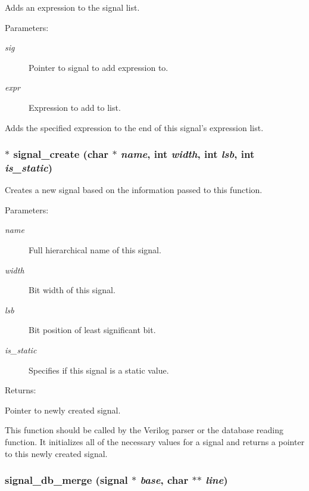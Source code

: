 Adds an expression to the signal list.

\begin{Desc}
\item[Parameters: ]\par
\begin{description}
\item[{\em 
sig}]Pointer to signal to add expression to. \item[{\em 
expr}]Expression to add to list.\end{description}
\end{Desc}
Adds the specified expression to the end of this signal's expression list. 
\subsubsection{$\ast$ signal\_\-create (char $\ast$ {\em name}, int {\em width}, int {\em lsb}, int {\em is\_\-static})}\label{signal_8c_a2}


Creates a new signal based on the information passed to this function.

\begin{Desc}
\item[Parameters: ]\par
\begin{description}
\item[{\em 
name}]Full hierarchical name of this signal. \item[{\em 
width}]Bit width of this signal. \item[{\em 
lsb}]Bit position of least significant bit. \item[{\em 
is\_\-static}]Specifies if this signal is a static value.\end{description}
\end{Desc}
\begin{Desc}
\item[Returns: ]\par
Pointer to newly created signal.\end{Desc}
This function should be called by the Verilog parser or the database reading function. It initializes all of the necessary values for a signal and returns a pointer to this newly created signal. 
\subsubsection{ signal\_\-db\_\-merge ({\bf signal} $\ast$ {\em base}, char $\ast$$\ast$ {\em line})}\label{signal_8c_a5}


